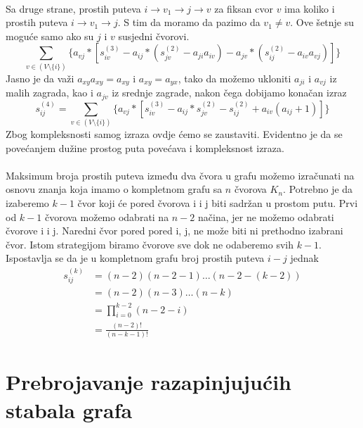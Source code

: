 \documentclass[11pt]{article}
\begin{document}
			\paragraph{}
			Sa druge strane, prostih puteva $i \rightarrow v_1 \rightarrow j \rightarrow v$ za fiksan cvor $v$ ima koliko i prostih puteva $i \rightarrow v_1 \rightarrow j$. 
			S tim da moramo da pazimo da $v_1 \neq v$. Ove šetnje su moguće samo ako su $j$ i $v$ susjedni čvorovi.
			\[
				\sum_{v \in (V \setminus \{i\})} \{a_{vj} * [s_{iv}^{(3)} - a_{ij} * (s_{jv}^{(2)} - a_{ji}a_{iv}) - a_{jv} * (s_{ij}^{(2)} -  a_{iv}a_{vj})]\}
			\]
			Jasno je da važi $a_{xy}a_{xy}=a_{xy}$ i $a_{xy}=a_{yx}$, tako da možemo ukloniti $a_{ji}$ i $a_{vj}$ iz malih zagrada, kao i $a_{jv}$ iz srednje zagrade, nakon čega dobijamo konačan izraz
			 \[
				s_{ij}^{(4)} = \sum_{v \in (V \setminus \{i\})} \{a_{vj} * [s_{iv}^{(3)} - a_{ij} * s_{jv}^{(2)} - s_{ij}^{(2)} +  a_{iv}( a_{ij} + 1)]\}
			 \]
			Zbog kompleksnosti samog izraza ovdje ćemo se zaustaviti. Evidentno je da se povećanjem dužine prostog puta povećava i kompleksnost izraza.
		
			\paragraph{}
			Maksimum broja prostih puteva između dva čvora u grafu možemo izračunati na osnovu znanja koja imamo o kompletnom grafu sa $n$ čvorova $K_n$.
			Potrebno je da izaberemo $k-1$ čvor koji će pored čvorova i i j biti sadržan u prostom putu. Prvi od $k-1$ čvorova možemo odabrati na $n-2$ načina, 
			jer ne možemo odabrati čvorove i i j. Naredni čvor pored pored i, j, ne može biti ni prethodno izabrani čvor. Istom strategijom biramo čvorove sve dok ne odaberemo svih $k-1$. 
			Ispostavlja se da je u kompletnom grafu broj prostih puteva $i-j$ jednak 
			\[
				\begin{split}
				s_{ij}^{(k)} & = (n-2)(n-2-1) \dots (n-2-(k-2)) \\
				                  & = (n-2)(n-3) \dots (n-k) \\
				                  & = \prod_{i=0}^{k-2} (n-2-i) \\ 
				                  & = \frac{(n-2)!}{(n-k-1)!}
				\end{split}
			\]
	\section{Prebrojavanje razapinjujućih stabala grafa}
	
\end{document}
